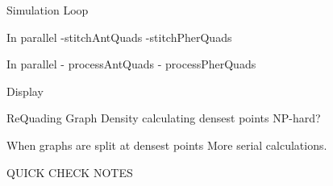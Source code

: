 \documentclass[main.tex]{subfiles}
\begin{document}
Simulation Loop

In parallel
-stitchAntQuads
-stitchPherQuads

In parallel
- processAntQuads
- processPherQuads

Display


ReQuading 
Graph Density
calculating densest points NP-hard?

When graphs are split at densest points
More serial calculations.

QUICK CHECK NOTES




\end{document}
